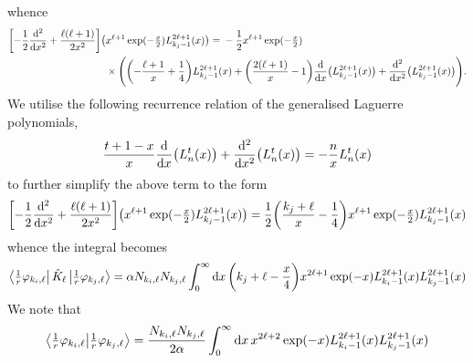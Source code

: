 \documentclass[]{article}
\begin{document}
whence
\begin{alignat*}{2}
  \lrsq[\bigg]
  {
    -
    \dfrac{1}{2}
    \dv[2]{x}
    +
    \dfrac
    {
      \ell
      \lr{\ell + 1}
    }
    {
      2
      x^{2}
    }
  }
  \lr[\big]
  {
    &
    x^{\ell + 1}
    \exponential\lr{-\tfrac{x}{2}}
    L_{k_{j} - 1}^{2 \ell + 1}\lr{x}
  }
  {}={}
  -
  \dfrac{1}{2}
  x^{\ell + 1}
  \exponential\lr{-\tfrac{x}{2}}
  \\
  &
  {}\times{}
  \lr[\Bigg]
  {
    \lr[\bigg]
    {
      -
      \dfrac
      {
        \ell + 1
      }
      {
        x
      }
      +
      \dfrac{1}{4}
    }
    L_{k_{j} - 1}^{2 \ell + 1}\lr{x}
    +
    \lr[\bigg]
    {
      \dfrac
      {
        2
        \lr{\ell + 1}
      }
      {
        x
      }
      -
      1
    }
    \dv{x}
    \lr[\big]
    {
      L_{k_{j} - 1}^{2 \ell + 1}\lr{x}
    }
    +
    \dv[2]{x}
    \lr[\big]
    {
      L_{k_{j} - 1}^{2 \ell + 1}\lr{x}
    }
  }
  .
\end{alignat*}
We utilise the following recurrence relation of the generalised Laguerre
polynomials,
\begin{equation*}
  \dfrac{t + 1 - x}{x}
  \dv{x}
  \lr[\big]
  {
    L_{n}^{t}\lr{x}
  }
  +
  \dv[2]{x}
  \lr[\big]
  {
    L_{n}^{t}\lr{x}
  }
  =
  -
  \dfrac{n}{x}
  L_{n}^{t}\lr{x}
\end{equation*}
to further simplify the above term to the form
\begin{equation*}
  \lrsq[\bigg]
  {
    -
    \dfrac{1}{2}
    \dv[2]{x}
    +
    \dfrac
    {
      \ell
      \lr{\ell + 1}
    }
    {
      2
      x^{2}
    }
  }
  \lr[\big]
  {
    x^{\ell + 1}
    \exponential\lr{-\tfrac{x}{2}}
    L_{k_{j} - 1}^{2 \ell + 1}\lr{x}
  }
  =
  \dfrac{1}{2}
  \lr[\bigg]
  {
    \dfrac
    {
      k_{j}
      +
      \ell
    }
    {
      x
    }
    -
    \dfrac{1}{4}
  }
  x^{\ell + 1}
  \exponential\lr{-\tfrac{x}{2}}
  L_{k_{j} - 1}^{2 \ell + 1}\lr{x}
\end{equation*}
whence the integral becomes
\begin{equation*}
  \bra{\tfrac{1}{r}\varphi_{k_{i}, \ell}}
  \hat{K}_{\ell}
  \ket{\tfrac{1}{r}\varphi_{k_{j}, \ell}}
  =
  \alpha
  N_{k_{i}, \ell}
  N_{k_{j}, \ell}
  \int_{0}^{\infty}
  \dd{x}
  \lr[\bigg]
  {
    k_{j}
    +
    \ell
    -
    \dfrac{x}{4}
  }
  x^{2\ell + 1}
  \exponential\lr{-x}
  L_{k_{i} - 1}^{2 \ell + 1}\lr{x}
  L_{k_{j} - 1}^{2 \ell + 1}\lr{x}
\end{equation*}
We note that
\begin{equation*}
  \bra{\tfrac{1}{r}\varphi_{k_{i}, \ell}}
  \ket{\tfrac{1}{r}\varphi_{k_{j}, \ell}}
  =
  \dfrac
  {
    N_{k_{i}, \ell}
    N_{k_{j}, \ell}
  }
  {
    2
    \alpha
  }
  \int_{0}^{\infty}
  \dd{x}
  {
    x^{2\ell + 2}
    \exponential\lr{-x}
    L_{k_{i} - 1}^{2\ell + 1}\lr{x}
    L_{k_{j} - 1}^{2\ell + 1}\lr{x}
  }
\end{equation*}
\end{document}
